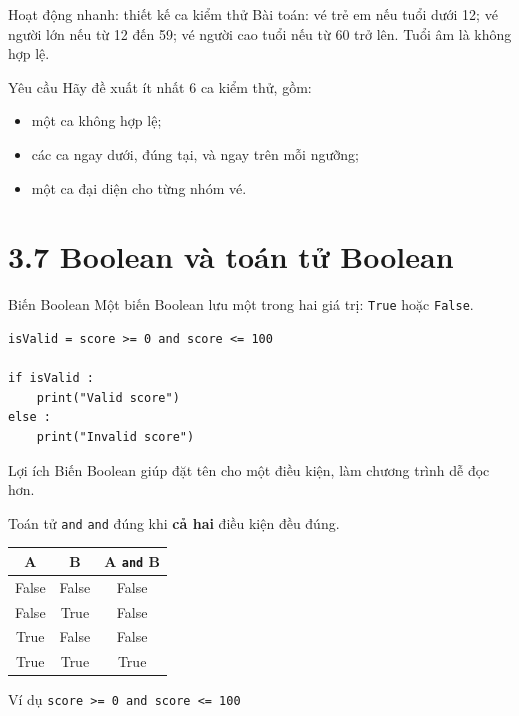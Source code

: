 \documentclass[aspectratio=169,11pt]{beamer}
\newcommand{\code}[1]{\texttt{#1}}
\begin{document}
\begin{frame}{Hoạt động nhanh: thiết kế ca kiểm thử}
Bài toán: vé trẻ em nếu tuổi dưới 12; vé người lớn nếu từ 12 đến 59; vé người cao tuổi nếu từ 60 trở lên. Tuổi âm là không hợp lệ.
\begin{block}{Yêu cầu}
Hãy đề xuất ít nhất 6 ca kiểm thử, gồm:
\begin{itemize}
  \item một ca không hợp lệ;
  \item các ca ngay dưới, đúng tại, và ngay trên mỗi ngưỡng;
  \item một ca đại diện cho từng nhóm vé.
\end{itemize}
\end{block}
\end{frame}

\section{3.7 Boolean và toán tử Boolean}

\begin{frame}[fragile]{Biến Boolean}
Một biến Boolean lưu một trong hai giá trị: \code{True} hoặc \code{False}.
\begin{lstlisting}[style=py]
isValid = score >= 0 and score <= 100

if isValid :
    print("Valid score")
else :
    print("Invalid score")
\end{lstlisting}
\begin{block}{Lợi ích}
Biến Boolean giúp đặt tên cho một điều kiện, làm chương trình dễ đọc hơn.
\end{block}
\end{frame}

\begin{frame}{Toán tử \texttt{and}}
\code{and} đúng khi \textbf{cả hai} điều kiện đều đúng.
\begin{center}
\begin{tabular}{ccc}
\toprule
A & B & A \code{and} B \\
\midrule
False & False & False \\
False & True  & False \\
True  & False & False \\
True  & True  & True \\
\bottomrule
\end{tabular}
\end{center}
\begin{exampleblock}{Ví dụ}
\code{score >= 0 and score <= 100}
\end{exampleblock}
\end{frame}
\end{document}
